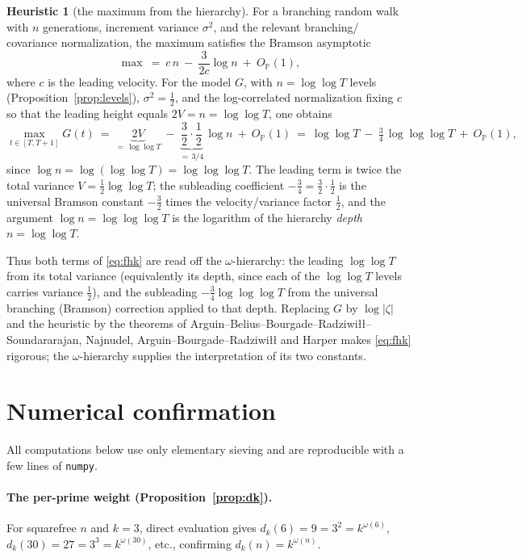 \documentclass[11pt]{amsart}
\theoremstyle{definition}
\newtheorem{heuristic}[theorem]{Heuristic}
\newcommand{\Pp}{\mathbb P}
\newcommand{\half}{\tfrac12}
\newcommand{\dk}{d_k}
\newcommand{\loglog}{\log\log}
\newcommand{\llll}{\log\log\log}
\begin{document}
\begin{heuristic}[the maximum from the hierarchy]\label{heur:max}
For a branching random walk with $n$ generations, increment variance $\sigma^2$, and the relevant branching/
covariance normalization, the maximum satisfies the Bramson asymptotic
\[
\max\ =\ c\,n\ -\ \frac{3}{2c}\log n\ +\ O_{\Pp}(1),
\]
where $c$ is the leading velocity. For the model $G$, with $n=\loglog T$ levels (Proposition~\ref{prop:levels}),
$\sigma^2=\half$, and the log-correlated normalization fixing $c$ so that the leading height equals
$2V=n=\loglog T$, one obtains
\[
\max_{t\in[T,T+1]}G(t)\ =\ \underbrace{2V}_{=\,\loglog T}\ -\ \underbrace{\frac32\cdot\frac12}_{=\,3/4}\,\log n\ +\ O_{\Pp}(1)\ =\ \loglog T\ -\ \tfrac34\,\llll T\ +\ O_{\Pp}(1),
\]
since $\log n=\log(\loglog T)=\llll T$. The leading term is twice the total variance $V=\half\loglog T$; the
subleading coefficient $-\tfrac34=\tfrac32\cdot\tfrac12$ is the universal Bramson constant $-\tfrac32$ times the
velocity/variance factor $\tfrac12$, and the argument $\log n=\llll T$ is the logarithm of the hierarchy
\emph{depth} $n=\loglog T$.
\end{heuristic}

Thus both terms of \eqref{eq:fhk} are read off the $\omega$-hierarchy: the leading $\loglog T$ from its total
variance (equivalently its depth, since each of the $\loglog T$ levels carries variance $\half$), and the
subleading $-\tfrac34\llll T$ from the universal branching (Bramson) correction applied to that depth. Replacing
$G$ by $\log|\zeta|$ and the heuristic by the theorems of Arguin--Belius--Bourgade--Radziwi{\l}{\l}--Soundararajan,
Najnudel, Arguin--Bourgade--Radziwi{\l}{\l} and Harper makes \eqref{eq:fhk} rigorous; the $\omega$-hierarchy
supplies the interpretation of its two constants.

\section{Numerical confirmation}\label{sec:numerics}

All computations below use only elementary sieving and are reproducible with a few lines of \texttt{numpy}.

\paragraph{The per-prime weight (Proposition~\ref{prop:dk}).} For squarefree $n$ and $k=3$, direct evaluation
gives $\dk(6)=9=3^2=k^{\omega(6)}$, $\dk(30)=27=3^3=k^{\omega(30)}$, etc., confirming $\dk(n)=k^{\omega(n)}$.
\end{document}

